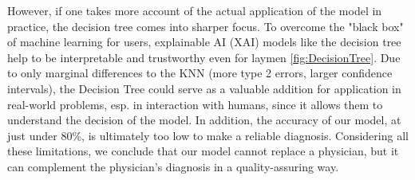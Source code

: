 However, if one takes more account of the actual application of the model in practice, the decision tree comes into sharper focus. To overcome the "black box" of machine learning for users, explainable AI (XAI) models like the decision tree help to be interpretable and trustworthy even for laymen \cref{fig:DecisionTree}. Due to only marginal differences to the KNN (more type 2 errors, larger confidence intervals), the Decision Tree could serve as a valuable addition for application in real-world problems, esp. in interaction with humans, since it allows them to understand the decision of the model. In addition, the accuracy of our model, at just under 80\%, is ultimately too low to make a reliable diagnosis. Considering all these limitations, we conclude that our model cannot replace a physician, but it can complement the physician's diagnosis in a quality-assuring way. 


